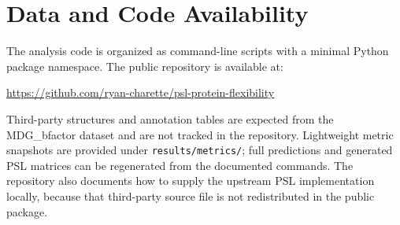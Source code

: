 \documentclass[11pt]{article}
\begin{document}
\section*{Data and Code Availability}
The analysis code is organized as command-line scripts with a minimal Python package namespace. The public repository is available at:
\begin{center}
\small\url{https://github.com/ryan-charette/psl-protein-flexibility}
\end{center}
Third-party structures and annotation tables are expected from the MDG\_bfactor dataset and are not tracked in the repository. Lightweight metric snapshots are provided under \texttt{results/metrics/}; full predictions and generated PSL matrices can be regenerated from the documented commands. The repository also documents how to supply the upstream PSL implementation locally, because that third-party source file is not redistributed in the public package.
\end{document}
